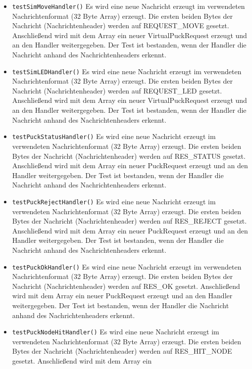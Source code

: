 \documentclass[10pt,a4paper]{article}
\begin{document}
\begin{itemize}
				\item \texttt{testSimMoveHandler()} Es wird eine neue Nachricht erzeugt im verwendeten Nachrichtenformat (32 Byte Array) erzeugt.
				Die ersten beiden Bytes der Nachricht (Nachrichtenheader) werden auf REQUEST\_MOVE gesetzt. Anschließend wird mit dem Array ein neuer
				VirtualPuckRequest erzeugt und an den Handler weitergegeben.
				Der Test ist bestanden, wenn der Handler die Nachricht anhand des Nachrichtenheaders erkennt.
				\item \texttt{testSimLEDHandler()} Es wird eine neue Nachricht erzeugt im verwendeten Nachrichtenformat (32 Byte Array) erzeugt.
				Die ersten beiden Bytes der Nachricht (Nachrichtenheader) werden auf REQUEST\_LED gesetzt. Anschließend wird mit dem Array ein neuer
				VirtualPuckRequest erzeugt und an den Handler weitergegeben.
				Der Test ist bestanden, wenn der Handler die Nachricht anhand des Nachrichtenheaders erkennt.
				\item \texttt{testPuckStatusHandler()} Es wird eine neue Nachricht erzeugt im verwendeten Nachrichtenformat (32 Byte Array) erzeugt.
				Die ersten beiden Bytes der Nachricht (Nachrichtenheader) werden auf RES\_STATUS gesetzt. Anschließend wird mit dem Array ein
				neuer PuckRequest erzeugt und an den Handler weitergegeben.
				Der Test ist bestanden, wenn der Handler die Nachricht anhand des Nachrichtenheaders erkennt.
				\item \texttt{testPuckRejectHandler()} Es wird eine neue Nachricht erzeugt im verwendeten Nachrichtenformat (32 Byte Array) erzeugt.
				Die ersten beiden Bytes der Nachricht (Nachrichtenheader) werden auf RES\_REJECT gesetzt. Anschließend wird mit dem Array ein
				neuer PuckRequest erzeugt und an den Handler weitergegeben.
				Der Test ist bestanden, wenn der Handler die Nachricht anhand des Nachrichtenheaders erkennt.
				\item \texttt{testPuckOkHandler()} Es wird eine neue Nachricht erzeugt im verwendeten Nachrichtenformat (32 Byte Array) erzeugt.
				Die ersten beiden Bytes der Nachricht (Nachrichtenheader) werden auf RES\_OK gesetzt. Anschließend wird mit dem Array ein
				neuer PuckRequest erzeugt und an den Handler weitergegeben.
				Der Test ist bestanden, wenn der Handler die Nachricht anhand des Nachrichtenheaders erkennt.
				\item \texttt{testPuckNodeHitHandler()} Es wird eine neue Nachricht erzeugt im verwendeten Nachrichtenformat (32 Byte Array) erzeugt.
				Die ersten beiden Bytes der Nachricht (Nachrichtenheader) werden auf RES\_HIT\_NODE gesetzt. Anschließend wird mit dem Array ein

\end{itemize}
\end{document}
